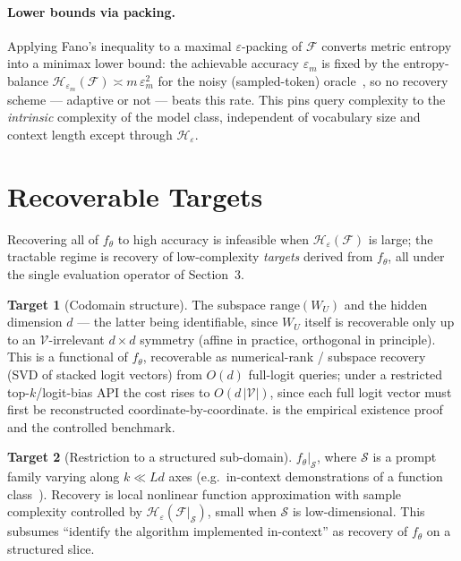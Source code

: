 \documentclass[11pt,a4paper]{article}
\theoremstyle{definition}
\newtheorem{target}{Target}
\newcommand{\Voc}{\mathcal{V}}
\newcommand{\Fclass}{\mathcal{F}}
\newcommand{\Hent}{\mathcal{H}}
\begin{document}
\paragraph{Lower bounds via packing.} Applying Fano's inequality to a maximal
$\varepsilon$-packing of $\Fclass$ converts metric entropy into a minimax lower
bound: the achievable accuracy $\varepsilon_m$ is fixed by the entropy-balance
$\Hent_{\varepsilon_m}(\Fclass)\asymp m\,\varepsilon_m^2$ for the noisy
(sampled-token) oracle~\citep{yangbarron1999minimax}, so no recovery scheme ---
adaptive or not --- beats this rate. This pins query complexity to the
\emph{intrinsic} complexity of the model class, independent of vocabulary size and
context length except through $\Hent_\varepsilon$.

\section{Recoverable Targets}
\label{sec:targets}

Recovering all of $f_\theta$ to high accuracy is infeasible when
$\Hent_\varepsilon(\Fclass)$ is large; the tractable regime is recovery of
low-complexity \emph{targets} derived from $f_\theta$, all under the single
evaluation operator of Section~3.

\begin{target}[Codomain structure]
The subspace $\mathrm{range}(W_U)$ and the hidden dimension $d$ --- the latter being
identifiable, since $W_U$ itself is recoverable only up to an $\Voc$-irrelevant
$d\times d$ symmetry (affine in practice, orthogonal in principle). This is a
functional of $f_\theta$, recoverable as numerical-rank / subspace recovery (SVD of
stacked logit vectors) from $O(d)$ full-logit queries; under a restricted
top-$k$/logit-bias API the cost rises to $O(d\,|\Voc|)$, since each full logit
vector must first be reconstructed coordinate-by-coordinate.
\citet{carlini2024stealing} is the empirical existence proof and the controlled
benchmark.
\end{target}

\begin{target}[Restriction to a structured sub-domain]
$f_\theta|_{\mathcal{S}}$, where $\mathcal{S}$ is a prompt family varying along
$k\ll Ld$ axes (e.g.\ in-context demonstrations of a function
class~\citep{garg2022what}). Recovery is local nonlinear function
approximation with sample complexity controlled by
$\Hent_\varepsilon(\Fclass|_{\mathcal{S}})$, small when $\mathcal{S}$ is
low-dimensional. This subsumes ``identify the algorithm implemented in-context''
as recovery of $f_\theta$ on a structured slice.
\end{target}
\end{document}
